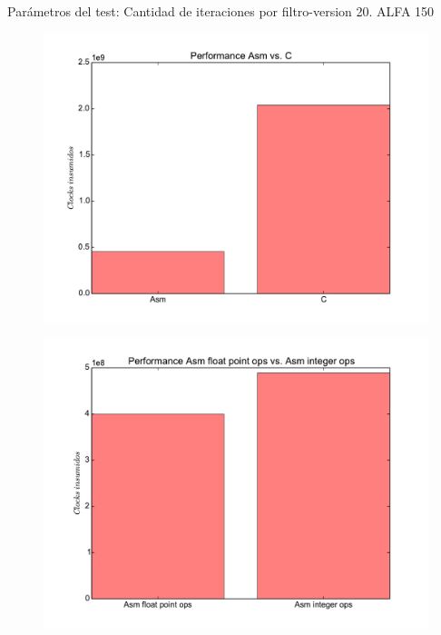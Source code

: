 
Parámetros del test: 
Cantidad de iteraciones por filtro-version 20.
ALFA 150

\begin{figure}[h]
  \begin{center}
	\includegraphics[scale=0.5]{ldrA.pdf}
  \end{center}
\end{figure}

\begin{figure}[h]
  \begin{center}
	\includegraphics[scale=0.5]{ldrB.pdf}
  \end{center}
\end{figure}


